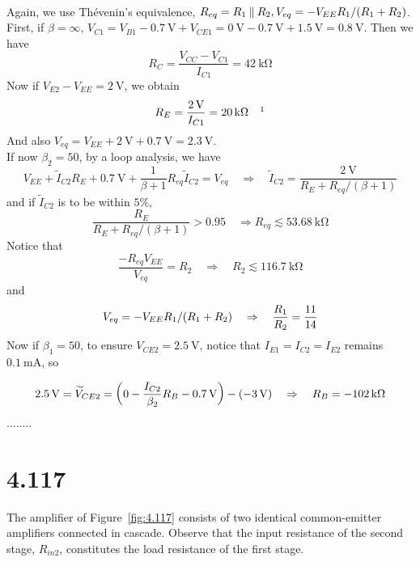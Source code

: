 \documentclass[12pt, a4paper]{article}
\begin{document}
\Ans \\
Again, we use Thévenin's equivalence, $R_{eq} = R_1 \mathbin{\|} R_2, V_{eq} = - V_{EE} R_1 / (R_1 + R_2)$.
First, if $\beta = \infty$, $V_{C1} = V_{B1} - \SI{0.7}\V + V_{CE1} = \SI{0}\V - \SI{0.7}\V + \SI{1.5}\V = \SI{0.8}\V$. Then we have
\[ R_C = \frac{V_{CC} - V_{C1}}{I_{C1}} = \SI{42}\kohm \]
Now if $V_{E2} - V_{EE} = \SI{2}\V$, we obtain
\[ R_E =\frac{\SI{2}\V}{I_{C1}}  =  \SI{20}\kohm \quad \footnotemark\]
And also $V_{eq} = V_{EE} + \SI{2}\V + \SI{0.7}\V = \SI{2.3}\V$. \\
If now $\beta_2 = 50$, by a loop analysis, we have
\[ V_{EE} + \widetilde{I}_{C2} R_E + \SI{0.7}\V + \frac{1}{\beta + 1}
  R_{eq} \widetilde{I}_{C2} = V_{eq} \quad \Rightarrow \quad 
\widetilde{I}_{C2} = \frac{\SI{2}\V}{R_E + R_{eq} / (\beta + 1)} \]
and if $\widetilde{I}_{C2}$ is to be within $5\%$,
\[
  \frac{R_E}{R_E + R_{eq} / (\beta+1)} > 0.95 \quad \Rightarrow
  R_{eq} \lesssim \SI{53.68}\kohm
\]
Notice that
\[
  \frac{- R_{eq} V_{EE}}{V_{eq}} = R_2 \quad \Rightarrow \quad R_2 \lesssim \SI{116.7}\kohm
\]
and 
\[
  V_{eq} = - V_{EE} R_1 / (R_1 + R_2) \quad \Rightarrow \quad  \frac{R_1}{R_2} =  \frac{11}{14} 
\]
Now if $\beta_1 = 50$, to ensure $V_{CE2} = \SI{2.5}\V$, notice that $I_{E1} = I_{C2} = I_{E2}$ remains $\SI{0.1}\mA$, so 

\newcommand{\VCE}{\widetilde{V}_{CE2}}
\[
  \SI{2.5}\V = \VCE = \left( 0 - \frac{I_{C2}}{\beta_2} R_{B} - \SI{0.7}\V \right ) - (\SI{-3}\V) \qRq R_B = \SI{-102}\kohm
\]
........

\section{4.117}
The amplifier of Figure~\ref{fig:4.117} consists of two identical common-emitter amplifiers connected in cascade. Observe that the input resistance of the second stage, $R_{in2}$, constitutes the load resistance of the first stage.
\end{document}
